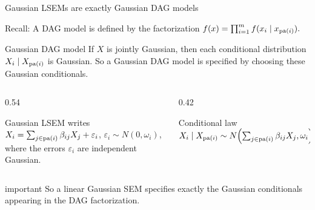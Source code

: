 \documentclass[dvipsnames,aspectratio=169,handout]{beamer}
\begin{document}
\begin{frame}{Gaussian LSEMs are exactly Gaussian DAG models}

{\small Recall: A DAG model is defined by the factorization
$
f(x)=\prod_{i=1}^m f(x_i\mid x_{\operatorname{pa}(i)}).
$}

\begin{block}{Gaussian DAG model}
If $X$ is jointly Gaussian, then each conditional distribution
$
X_i \mid X_{\operatorname{pa}(i)}
$
is Gaussian.
So a Gaussian DAG model is specified by choosing these Gaussian conditionals.
\end{block}

\begin{columns}[T]
\begin{column}{0.54\textwidth}
\begin{block}{}
Gaussian LSEM writes\\[1mm]
\qquad\qquad$
X_i=\sum_{j\in\operatorname{pa}(i)} \beta_{ij}X_j+\varepsilon_i$,\quad 
$\varepsilon_i\sim N(0,\omega_i)$,\\[1mm] where the errors $\varepsilon_i$ are independent Gaussian.
\end{block}
\end{column}

\begin{column}{0.42\textwidth}
\begin{alertblock}{Conditional law}
\ \\
\quad $
X_i\mid X_{\operatorname{pa}(i)}
\sim
N\!\left(
\sum_{j\in\operatorname{pa}(i)} \beta_{ij}X_j,
\omega_i
\right).
$
\end{alertblock}
\end{column}
\end{columns}

\begin{beamercolorbox}[wd=\textwidth,sep=7pt,center,rounded=true,shadow=true]{important}
So a linear Gaussian SEM specifies exactly the Gaussian conditionals appearing in the DAG factorization.
\end{beamercolorbox}
\end{frame}
\end{document}
